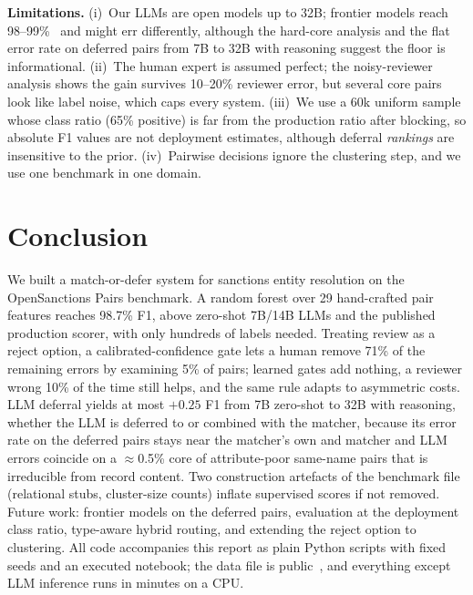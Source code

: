 \documentclass[conference]{IEEEtran}
\begin{document}
\textbf{Limitations.} (i)~Our LLMs are open models up to 32B; frontier models reach 98--99\%~\cite{smith2026opensanctions} and might err differently, although the hard-core analysis and the flat error rate on deferred pairs from 7B to 32B with reasoning suggest the floor is informational. (ii)~The human expert is assumed perfect; the noisy-reviewer analysis shows the gain survives 10--20\% reviewer error, but several core pairs look like label noise, which caps every system. (iii)~We use a 60k uniform sample whose class ratio (65\% positive) is far from the production ratio after blocking, so absolute F1 values are not deployment estimates, although deferral \emph{rankings} are insensitive to the prior. (iv)~Pairwise decisions ignore the clustering step, and we use one benchmark in one domain.

\section{Conclusion}
We built a match-or-defer system for sanctions entity resolution on the OpenSanctions Pairs benchmark. A random forest over 29 hand-crafted pair features reaches 98.7\% F1, above zero-shot 7B/14B LLMs and the published production scorer, with only hundreds of labels needed. Treating review as a reject option, a calibrated-confidence gate lets a human remove 71\% of the remaining errors by examining 5\% of pairs; learned gates add nothing, a reviewer wrong 10\% of the time still helps, and the same rule adapts to asymmetric costs. LLM deferral yields at most $+0.25$ F1 from 7B zero-shot to 32B with reasoning, whether the LLM is deferred to or combined with the matcher, because its error rate on the deferred pairs stays near the matcher's own and matcher and LLM errors coincide on a $\approx$0.5\% core of attribute-poor same-name pairs that is irreducible from record content. Two construction artefacts of the benchmark file (relational stubs, cluster-size counts) inflate supervised scores if not removed. Future work: frontier models on the deferred pairs, evaluation at the deployment class ratio, type-aware hybrid routing, and extending the reject option to clustering. All code accompanies this report as plain Python scripts with fixed seeds and an executed notebook; the data file is public~\cite{opensanctions_pairs_docs}, and everything except LLM inference runs in minutes on a CPU.

\balance


\end{document}
